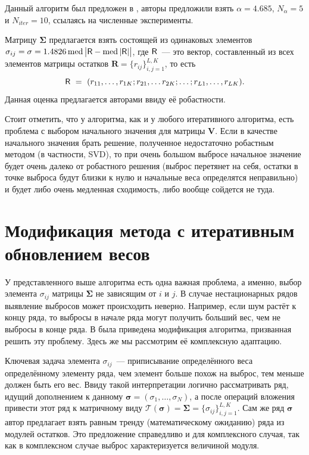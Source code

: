 \documentclass[specialist,
               substylefile = spbu.rtx,
               subf,href,colorlinks=true, 12pt]{disser}
\DeclareMathOperator{\med}{med}
\begin{document}
Данный алгоритм был предложен в \cite{Chen}, авторы предложили взять $\alpha = 4.685$, $N_{\alpha} = 5$ и $N_{iter} = 10$, ссылаясь на численные эксперименты.

Матрицу $\mathbf{\Sigma}$ предлагается взять состоящей из одинаковых элементов $\sigma_{ij} = \sigma = 1.4826 \med {\big|\tR-\med {|\tR|}\big|}$, где $\textsf{R}$~--- это вектор, составленный из всех элементов матрицы остатков $\mathbf{R} = \{r_{ij}\}_{i,j=1}^{L,K}$, то есть
\begin{equation*}
	\textsf{R}~=~(r_{11},\ldots,r_{1K}; r_{21},\ldots r_{2K};\ldots;r_{L1},\ldots,r_{LK}).
\end{equation*}
Данная оценка предлагается авторами ввиду её робастности.

Стоит отметить, что у алгоритма, как и у любого итеративного алгоритма, есть проблема с выбором начального значения для матрицы $\mathbf{V}$. Если в качестве начального значения брать решение, полученное недостаточно робастным методом (в частности, SVD), то при очень большом выбросе начальное значение будет очень далеко от робастного решения (выброс перетянет на себя, остатки в точке выброса будут близки к нулю и начальные веса определятся неправильно) и будет либо очень медленная сходимость, либо вообще сойдется не туда.


\section{Модификация метода с итеративным обновлением весов}

У представленного выше алгоритма есть одна важная проблема, а именно, выбор элемента $\sigma_{ij}$ матрицы $\mathbf{\Sigma}$ не зависящим от $i$ и $j$. В случае нестационарных рядов выявление выбросов может происходить неверно. Например, если шум растёт к концу ряда, то выбросы в начале ряда могут получить больший вес, чем не выбросы в конце ряда. В \cite{Tretyakova20} была приведена модификация алгоритма, призванная решить эту проблему. Здесь же мы рассмотрим её комплексную адаптацию.

Ключевая задача элемента $\sigma_{ij}$~--- приписывание определённого веса определённому элементу ряда, чем элемент больше похож на выброс, тем меньше должен быть его вес. Ввиду такой интерпретации логично рассматривать ряд, идущий дополнением к данному $\bm{\sigma} = (\sigma_1,\ldots,\sigma_N)$, а после операций вложения привести этот ряд к матричному виду $\mathcal{T} (\bm{\sigma}) = \mathbf{\Sigma}=\{\sigma_{ij}\}_{i,j=1}^{L,K}$. Сам же ряд $\bm{\sigma}$ автор \cite{Tretyakova20} предлагает взять равным тренду (математическому ожиданию) ряда из модулей остатков. Это предложение справедливо и для комплексного случая, так как в комплексном случае выброс характеризуется величиной модуля.
\end{document}
